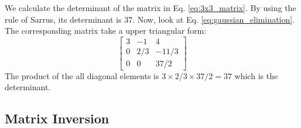 \begin{example}
We calculate the determinant of the matrix in Eq. \eqref{eq:3x3_matrix}.
By using the rule of Sarrus, its determinant is 37.  Now, look at Eq. \eqref{eq:gaussian_elimination}. The corresponding matrix take a upper triangular form:
\begin{equation}
\begin{bmatrix} 3 & -1 & 4 \\ 0 & 2/3 & -11/3 \\ 0 & 0 & 37/2 \end{bmatrix}
\end{equation}
The product of the all diagonal elements is $3 \times 2/3 \times 37/2 = 37$ which is the determinant. 
\end{example}

\noindent
\subsection{Matrix Inversion}

